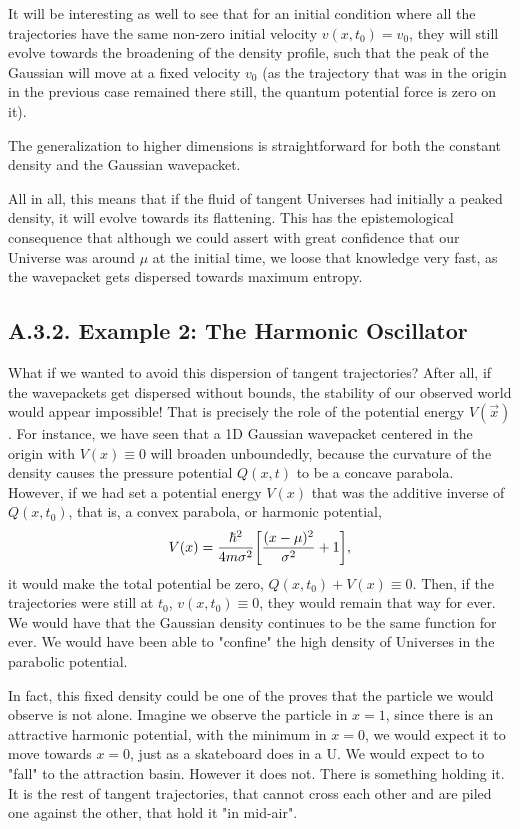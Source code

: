 \documentclass[11pt, a4paper]{article} %
\begin{document}
It will be interesting as well to see that for an initial condition where all the trajectories have the same non-zero initial velocity $v(x,t_0)=v_0$, they will still evolve towards the broadening of the density profile, such that the peak of the Gaussian will move at a fixed velocity $v_0$ (as the trajectory that was in the origin in the previous case remained there still, the quantum potential force is zero on it).

The generalization to higher dimensions is straightforward for both the constant density and the Gaussian wavepacket.

All in all, this means that if the fluid of tangent Universes had initially a peaked density, it will evolve towards its flattening. This has the epistemological consequence that although we could assert with great confidence that our Universe was around $\mu$ at the initial time, we loose that knowledge very fast, as the wavepacket gets dispersed towards maximum entropy.



\subsection*{A.3.2. Example 2: The Harmonic Oscillator}
What if we wanted to avoid this dispersion of tangent trajectories? After all, if the wavepackets get dispersed without bounds, the stability of our observed world would appear impossible! That is precisely the role of the potential energy $V(\vec{x})$. For instance, we have seen that a 1D Gaussian wavepacket centered in the origin with $V(x)\equiv 0$ will broaden unboundedly, because the curvature of the density causes the pressure potential $Q(x,t)$ to be a concave parabola. However, if we had set a potential energy $V(x)$ that was the additive inverse of $Q(x, t_0)$, that is, a convex parabola, or harmonic potential,
\begin{equation}
V(x)=\frac{\hbar^2}{4m\sigma^2}\qty[\frac{(x-\mu)^2}{\sigma^2}+1],
\end{equation}
it would make the total potential be zero, $Q(x,t_0)+V(x)\equiv 0$. Then, if the trajectories were still at $t_0$, $v(x,t_0)\equiv 0$, they would remain that way for ever. We would have that the Gaussian density continues to be the same function for ever. We would have been able to "confine" the high density of Universes in the parabolic potential.

In fact, this fixed density could be one of the proves that the particle we would observe is not alone. Imagine we observe the particle in $x=1$, since there is an attractive harmonic potential, with the minimum in $x=0$, we would expect it to move towards $x=0$, just as a skateboard does in a U. We would expect to to "fall" to the attraction basin. However it does not. There is something holding it. It is the rest of tangent trajectories, that cannot cross each other and are piled one against the other, that hold it "in mid-air".
\end{document}
